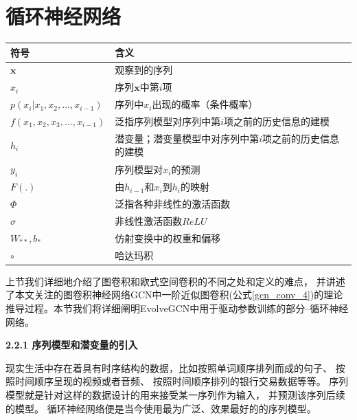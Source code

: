   \section{循环神经网络} \label{sec:B2}
      \begin{center}
        \begin{tabular}{ll}
          \toprule
          符号 & 含义\\ 
          \midrule
          $\mathbf{x}$ & 观察到的序列 \\
          $x_i$ & 序列$\mathbf{x}$中第$i$项 \\
          $p(x_i | x_1,x_2,...,x_{i-1})$ & 序列中$x_i$出现的概率（条件概率）\\
          $f(x_1, x_2, x_3,...,x_{i-1})$ & 泛指序列模型对序列中第$i$项之前的历史信息的建模 \\
          $h_i$ & 潜变量；潜变量模型中对序列中第$i$项之前的历史信息的建模 \\
          $y_i$ & 序列模型对$x_i$的预测 \\
          $F(.)$ & 由$h_{i-1}$和$x_i$到$h_i$的映射 \\
          $\Phi$ & 泛指各种非线性的激活函数 \\
          $\sigma$ & 非线性激活函数$ReLU$ \\
          $W_{**}, b_{*}$ & 仿射变换中的权重和偏移 \\ 
          $\circ$ & 哈达玛积 \\
          \bottomrule
        \end{tabular}
      \end{center}

      上节我们详细地介绍了图卷积和欧式空间卷积的不同之处和定义的难点，
      并讲述了本文关注的图卷积神经网络GCN中一阶近似图卷积(公式\ref{gcn_conv_4})的理论
      推导过程。本节我们将详细阐明EvolveGCN中用于驱动参数训练的部分--循环神经网络。

      \textbf{2.2.1 序列模型和潜变量的引入}

      现实生活中存在着具有时序结构的数据，比如按照单词顺序排列而成的句子、
      按照时间顺序呈现的视频或者音频、
      按照时间顺序排列的银行交易数据等等。
      序列模型就是针对这样的数据设计的用来接受某一序列作为输入，
      并预测该序列后续的模型。
      循环神经网络便是当今使用最为广泛、效果最好的的序列模型。

